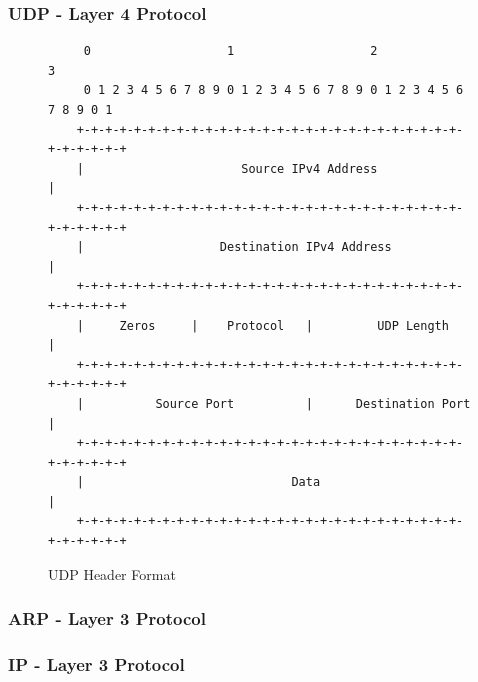 \documentclass[11pt]{article}
\begin{document}
\subsubsection{UDP - Layer 4 Protocol}

\begin{figure}[H]
    \centering
    \footnotesize
    \begin{varwidth}{\linewidth}
    \begin{verbatim}
     0                   1                   2                   3
     0 1 2 3 4 5 6 7 8 9 0 1 2 3 4 5 6 7 8 9 0 1 2 3 4 5 6 7 8 9 0 1
    +-+-+-+-+-+-+-+-+-+-+-+-+-+-+-+-+-+-+-+-+-+-+-+-+-+-+-+-+-+-+-+-+
    |                      Source IPv4 Address                      |
    +-+-+-+-+-+-+-+-+-+-+-+-+-+-+-+-+-+-+-+-+-+-+-+-+-+-+-+-+-+-+-+-+
    |                   Destination IPv4 Address                    |
    +-+-+-+-+-+-+-+-+-+-+-+-+-+-+-+-+-+-+-+-+-+-+-+-+-+-+-+-+-+-+-+-+
    |     Zeros     |    Protocol   |         UDP Length            |
    +-+-+-+-+-+-+-+-+-+-+-+-+-+-+-+-+-+-+-+-+-+-+-+-+-+-+-+-+-+-+-+-+
    |          Source Port          |      Destination Port         |
    +-+-+-+-+-+-+-+-+-+-+-+-+-+-+-+-+-+-+-+-+-+-+-+-+-+-+-+-+-+-+-+-+
    |                             Data                              |
    +-+-+-+-+-+-+-+-+-+-+-+-+-+-+-+-+-+-+-+-+-+-+-+-+-+-+-+-+-+-+-+-+
    \end{verbatim}
    \end{varwidth}
    \caption{UDP Header Format}\label{fig:udp_header}
\end{figure}

\subsubsection{ARP - Layer 3 Protocol}

\subsubsection{IP - Layer 3 Protocol}
\end{document}
